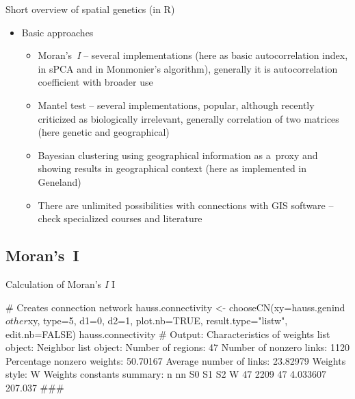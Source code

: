 \documentclass[compress, ucs, xelatex, 11pt, xcolor=svgnames,
  hyperref={
    bookmarks=true,
    unicode=true,
    colorlinks=true,
    pdftitle={Molecular data in R},
    plainpages=false,
    pdfauthor={Vojtech Zeisek},
    pdfsubject={Course about phylogeny and evolution in R},
    pdfcreator={XeLaTeX},
    pdfkeywords={R, evolution, phylogeny, molecular data},
    linkcolor=Tomato,
    anchorcolor=SaddleBrown,
    citecolor=Goldenrod,
    filecolor=DarkMagenta,
    menucolor=Sienna,
    urlcolor=DarkTurquoise,
    pdftex},
  url={hyphens, lowtilde} %
  ]{beamer}
\begin{document}
\begin{frame}{Short overview of spatial genetics (in R)}
\begin{itemize}
  \item Basic approaches
  \begin{itemize}
    \item Moran's~\textit{I} -- several implementations (here as basic autocorrelation index, in sPCA and in Monmonier's algorithm), generally it is autocorrelation coefficient with broader use
    \item Mantel test -- several implementations, popular, although recently criticized as biologically irrelevant, generally correlation of two matrices (here genetic and geographical)
    \item Bayesian clustering using geographical information as a~proxy and showing results in geographical context (here as implemented in Geneland)
    \item There are unlimited possibilities with connections with GIS software -- check specialized courses and literature
  \end{itemize}
\end{itemize}
\end{frame}

\subsection{Moran's~I}

\begin{frame}[fragile]{Calculation of Moran's \textit{I} I}
  \begin{spluscode}
    # Creates connection network
    hauss.connectivity <- chooseCN(xy=hauss.genind$other$xy, type=5,
      d1=0, d2=1, plot.nb=TRUE, result.type="listw", edit.nb=FALSE)
    hauss.connectivity
    # Output:
    Characteristics of weights list object:
    Neighbor list object:
    Number of regions: 47
    Number of nonzero links: 1120
    Percentage nonzero weights: 50.70167
    Average number of links: 23.82979
    Weights style: W
    Weights constants summary:
       n   nn S0       S1      S2
    W 47 2209 47 4.033607 207.037
    ###
  \end{spluscode}
\end{frame}
\end{document}
